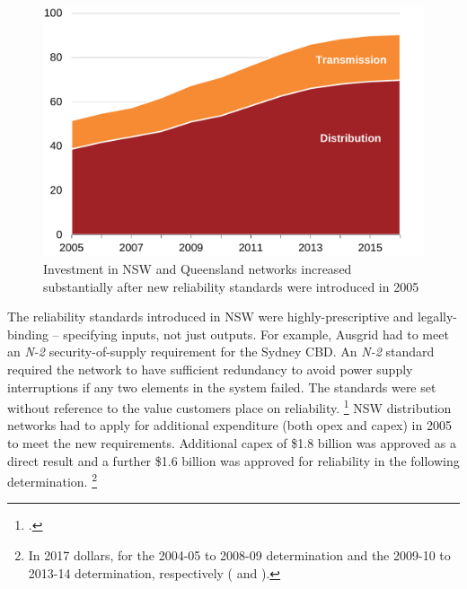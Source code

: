 \documentclass[FrontPage]{grattan}
\begin{document}
\begin{figure}
\caption{Investment in NSW and Queensland networks increased substantially after new reliability standards were introduced in 2005}\label{fig:capex-over-time}
\includegraphics[page=6]{atlas/Charts.pdf}
\end{figure}

The reliability standards introduced in NSW were highly-prescriptive and legally-binding -- specifying inputs, not just outputs. For example, Ausgrid had to meet an \emph{N-2} security-of-supply requirement for the Sydney CBD\@. An \emph{N-2} standard required the network to have sufficient redundancy to avoid power supply interruptions if any two elements in the system failed. The standards were set without reference to the value customers place on reliability.%
\footcite{IPART2016ReliabilityStandardsReview}
NSW distribution networks had to apply for additional expenditure (both opex and capex) in 2005 to meet the new requirements. Additional capex of \$1.8 billion was approved as a direct result and a further \$1.6 billion was approved for reliability in the following determination.%
\footnote{In 2017 dollars, for the 2004-05 to 2008-09 determination and the 2009-10 to 2013-14 determination, respectively (\textcite{IPART2006statementofreasons} and \textcite[][119]{AER2009NSWDistributionFinalDetermination}).}
\end{document}
